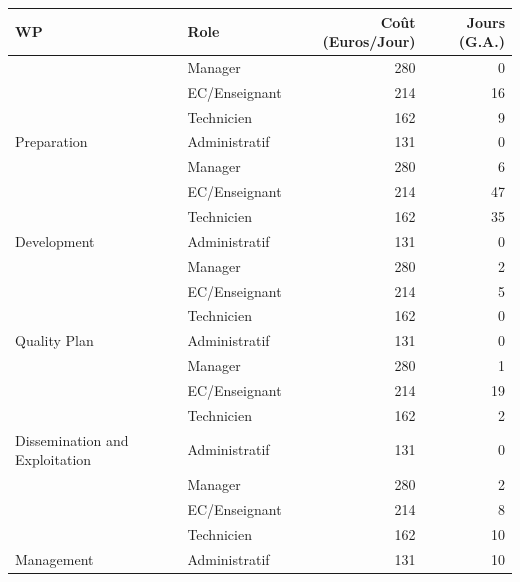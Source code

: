 \documentclass[
  a4paperpaper,
  onecolumn]{article}
\begin{document}
\begin{table}[!h]
\centering\begingroup\fontsize{10}{12}\selectfont

\begin{tabular}[t]{llrr}
\toprule
WP & Role & Coût (Euros/Jour) & Jours (G.A.)\\
\midrule
 & Manager & 280 & 0\\

 & EC/Enseignant & 214 & 16\\

 & Technicien & 162 & 9\\

\multirow{-4}{*}{\raggedright\arraybackslash Preparation} & Administratif & 131 & 0\\
\cmidrule{1-4}
 & Manager & 280 & 6\\

 & EC/Enseignant & 214 & 47\\

 & Technicien & 162 & 35\\

\multirow{-4}{*}{\raggedright\arraybackslash Development} & Administratif & 131 & 0\\
\cmidrule{1-4}
 & Manager & 280 & 2\\

 & EC/Enseignant & 214 & 5\\

 & Technicien & 162 & 0\\

\multirow{-4}{*}{\raggedright\arraybackslash Quality Plan} & Administratif & 131 & 0\\
\cmidrule{1-4}
 & Manager & 280 & 1\\

 & EC/Enseignant & 214 & 19\\

 & Technicien & 162 & 2\\

\multirow{-4}{*}{\raggedright\arraybackslash Dissemination and Exploitation} & Administratif & 131 & 0\\
\cmidrule{1-4}
 & Manager & 280 & 2\\

 & EC/Enseignant & 214 & 8\\

 & Technicien & 162 & 10\\

\multirow{-4}{*}{\raggedright\arraybackslash Management} & Administratif & 131 & 10\\
\bottomrule
\end{tabular}
\endgroup{}
\end{table}
\end{document}
